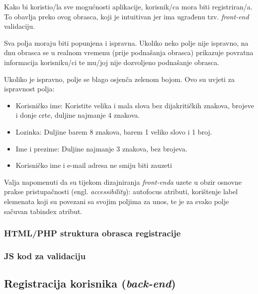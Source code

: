       Kako bi koristio/la sve mogućnosti aplikacije, korisnik/ca mora biti
      registriran/a. To obavlja preko ovog obrasca, koji je intuitivan jer ima
      ugrađenu tzv. \textit{front-end} validaciju.

      Sva polja moraju biti popunjena i ispravna. Ukoliko neko polje nije ispravno,
      na dnu obrasca se u realnom vremenu (prije podnašanja obrasca) prikazuje
      povratna informacija korisniku/ci te mu/joj nije dozvoljeno podnašanje
      obrasca.

      Ukoliko je ispravno, polje se blago osjenča zelenom bojom. Ovo su uvjeti za
      ispravnost polja:

      \begin{itemize}
        \item Korisničko ime: Koristite velika i mala slova bez dijakritičkih
        znakova, brojeve i donje crte, duljine najmanje 4 znakova.
        \item Lozinka: Duljine barem 8 znakova, barem 1 veliko slovo i 1 broj.
        \item Ime i prezime: Duljine najmanje 3 znakova, bez brojeva.
        \item Korisničko ime i e-mail adresa ne smiju biti zauzeti
      \end{itemize}

      Valja napomenuti da su tijekom dizajniranja \textit{front-enda} uzete u
      obzir osnovne prakse pristupačnosti (engl. \textit{accessibility}):
      autofocus atributi, korištenje label elemenata koji su povezani sa svojim
      poljima za unos, te je za svako polje sačuvan tabindex atribut.

      \subsubsection{HTML/PHP struktura obrasca registracije}

        

      \subsubsection{JS kod za validaciju}

        

  \subsection{Registracija korisnika (\textit{back-end})}

